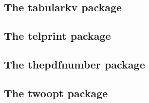 \documentclass[a4paper,12pt]{article}
\makeatletter
\newcommand*{\xpackage}[1]{\textsf{#1}}
\newcommand*{\cs}[1]{\texttt{\textbackslash#1}}
\newcommand*{\tocinclude}[1]{%
  \setcounter{tocdepth}{3}%
  \begingroup
    \makeatletter
    \def\@prj{#1}%
    \let\contentsline\foreign@contentsline
  \endgroup
}
\def\foreign@contentsline#1#2#3#4{%
  \ifx\\#4\\%
    \csname l@#1\endcsname{#2}{#3}%
  \else
    \ifHy@linktocpage
      \csname l@#1\endcsname{{#2}}{%
        \hyper@linkfile{#3}{\@prj.pdf}{#4}%
      }%
    \else
      \csname l@#1\endcsname{%
        \hyper@linkfile{#2}{\@prj.pdf}{#4}%
      }{#3}%
    \fi
  \fi
}%
\newcommand*{\pkgsectformat}[1]{%
  \texorpdfstring{%
    \textcolor{link}{The} %
    \xpackage{#1} %
    \textcolor{link}{package}%
  }{#1}%
}
\makeatother
\begin{document}
\newpage
\subsection{\pkgsectformat{tabularkv}}
\label{tabularkv}
\begin{abstract}
This package adds a key value interface for tabular
by the new environment \texttt{tabularkv}. Thus the
\TeX\ source code looks better by named parameters,
especially if package \xpackage{tabularht} is used.
\end{abstract}
\tocinclude{tabularkv}

\newpage
\subsection{\pkgsectformat{telprint}}
\label{telprint}
\begin{abstract}
Package \xpackage{telprint} provides \cs{telprint} for formatting
German phone numbers.
\end{abstract}
\tocinclude{telprint}

\newpage
\subsection{\pkgsectformat{thepdfnumber}}
\label{thepdfnumber}
\begin{abstract}
The package converts real numbers to a minimal representation
that is stripped from leading or trailing zeros,
plus signs and decimal point if not necessary.
\end{abstract}
\tocinclude{thepdfnumber}


\newpage
\subsection{\pkgsectformat{twoopt}}
\label{twoopt}
\begin{abstract}
This package provides commands to define macros with two
optional arguments.
\end{abstract}
\tocinclude{twoopt}
\end{document}
